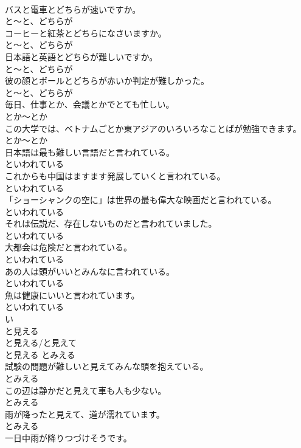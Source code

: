 \documentclass[8pt]{extreport}
\begin{document}
\begin{CJK}{UTF8}{min}
\\	バスと電車とどちらが速いですか。	
\\	と～と、どちらが
\\	コーヒーと紅茶とどちらになさいますか。	
\\	と～と、どちらが
\\	日本語と英語とどちらが難しいですか。	
\\	と～と、どちらが
\\	彼の顔とボールとどちらが赤いか判定が難しかった。	
\\	と～と、どちらが
\\	毎日、仕事とか、会議とかでとても忙しい。	
\\	とか～とか
\\	この大学では、ベトナムごとか東アジアのいろいろなことばが勉強できます。	
\\	とか～とか
\\	日本語は最も難しい言語だと言われている。	
\\	といわれている
\\	これからも中国はますます発展していくと言われている。	
\\	といわれている
\\	「ショーシャンクの空に」は世界の最も偉大な映画だと言われている。	
\\	といわれている
\\	それは伝説だ、存在しないものだと言われていました。	
\\	といわれている
\\	大都会は危険だと言われている。	
\\	といわれている
\\	あの人は頭がいいとみんなに言われている。	
\\	といわれている
\\	魚は健康にいいと言われています。	
\\	といわれている
\\	い
\\	と見える	
\\	と見える/と見えて	
\\	と見える	とみえる
\\	試験の問題が難しいと見えてみんな頭を抱えている。	
\\	とみえる
\\	この辺は静かだと見えて車も人も少ない。	
\\	とみえる
\\	雨が降ったと見えて、道が濡れています。	
\\	とみえる
\\	一日中雨が降りつづけそうです。	

\end{CJK}
\end{document}
